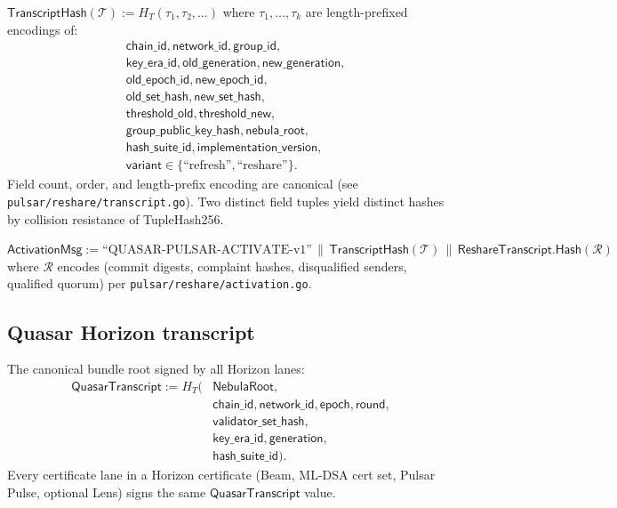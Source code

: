 \begin{definition}
\label{def:pulsar-transcript}
$\mathsf{TranscriptHash}(\mathcal{T}) := H_T(\tau_1, \tau_2, \ldots)$
where $\tau_1, \ldots, \tau_k$ are length-prefixed encodings of:
\begin{align*}
&\mathsf{chain\_id}, \mathsf{network\_id}, \mathsf{group\_id}, \\
&\mathsf{key\_era\_id}, \mathsf{old\_generation}, \mathsf{new\_generation}, \\
&\mathsf{old\_epoch\_id}, \mathsf{new\_epoch\_id}, \\
&\mathsf{old\_set\_hash}, \mathsf{new\_set\_hash}, \\
&\mathsf{threshold\_old}, \mathsf{threshold\_new}, \\
&\mathsf{group\_public\_key\_hash}, \mathsf{nebula\_root}, \\
&\mathsf{hash\_suite\_id}, \mathsf{implementation\_version}, \\
&\mathsf{variant} \in \{\text{``refresh''}, \text{``reshare''}\}.
\end{align*}
Field count, order, and length-prefix encoding are canonical (see
\texttt{pulsar/reshare/transcript.go}). Two distinct field tuples
yield distinct hashes by collision resistance of TupleHash256.
\end{definition}

\begin{definition}
\label{def:pulsar-activation-msg}
$\mathsf{ActivationMsg} := \text{``QUASAR-PULSAR-ACTIVATE-v1''}
\,\|\, \mathsf{TranscriptHash}(\mathcal{T}) \,\|\,
\mathsf{ReshareTranscript.Hash}(\mathcal{R})$
where $\mathcal{R}$ encodes (commit digests, complaint hashes,
disqualified senders, qualified quorum) per
\texttt{pulsar/reshare/activation.go}.
\end{definition}

\subsection*{Quasar Horizon transcript}

\begin{definition}
\label{def:horizon-transcript}
The canonical bundle root signed by all Horizon lanes:
\begin{align*}
\mathsf{QuasarTranscript} := H_T\bigl( &\mathsf{NebulaRoot}, \\
& \mathsf{chain\_id}, \mathsf{network\_id},
  \mathsf{epoch}, \mathsf{round}, \\
& \mathsf{validator\_set\_hash}, \\
& \mathsf{key\_era\_id}, \mathsf{generation}, \\
& \mathsf{hash\_suite\_id} \bigr).
\end{align*}
Every certificate lane in a Horizon certificate (Beam, ML-DSA cert
set, Pulsar Pulse, optional Lens) signs the same
$\mathsf{QuasarTranscript}$ value.
\end{definition}

